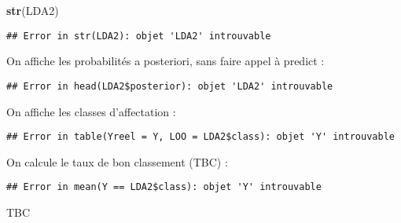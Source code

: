 \documentclass[
]{article}
\newenvironment{Shaded}{\begin{snugshade}}{\end{snugshade}}
\newcommand{\DataTypeTok}[1]{\textcolor[rgb]{0.13,0.29,0.53}{#1}}
\newcommand{\KeywordTok}[1]{\textcolor[rgb]{0.13,0.29,0.53}{\textbf{#1}}}
\newcommand{\NormalTok}[1]{#1}
\newcommand{\OperatorTok}[1]{\textcolor[rgb]{0.81,0.36,0.00}{\textbf{#1}}}
\begin{document}
\begin{Shaded}
\begin{Highlighting}[]
\KeywordTok{str}\NormalTok{(LDA2)}
\end{Highlighting}
\end{Shaded}

\begin{verbatim}
## Error in str(LDA2): objet 'LDA2' introuvable
\end{verbatim}

On affiche les probabilités a posteriori, sans faire appel à predict :

\begin{Shaded}
\end{Shaded}

\begin{verbatim}
## Error in head(LDA2$posterior): objet 'LDA2' introuvable
\end{verbatim}

On affiche les classes d'affectation :

\begin{Shaded}
\end{Shaded}

\begin{verbatim}
## Error in table(Yreel = Y, LOO = LDA2$class): objet 'Y' introuvable
\end{verbatim}

On calcule le taux de bon classement (TBC) :

\begin{Shaded}
\end{Shaded}

\begin{verbatim}
## Error in mean(Y == LDA2$class): objet 'Y' introuvable
\end{verbatim}

\begin{Shaded}
\begin{Highlighting}[]
\NormalTok{TBC}
\end{Highlighting}
\end{Shaded}
\end{document}
